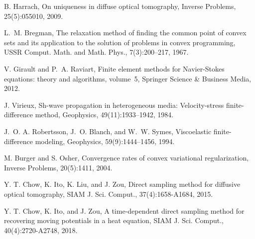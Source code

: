 \documentclass[11pt]{article}%
\renewcommand{\_}{{\fontfamily{ptm}\selectfont\textunderscore}}
\theoremstyle{plain}
\numberwithin{equation}{section}
\begin{document}
\begin{thebibliography}{lsq}
B. Harrach, On uniqueness in diffuse optical tomography, Inverse Problems, 25(5):055010, 2009.



L.~M. Bregman, The relaxation method of finding the common point of convex sets and its application to the solution of problems in convex programming, USSR Comput. Math. and Math. Phys.,
  7(3):200--217, 1967.

V. Girault and P.~A. Raviart, Finite element methods for Navier-Stokes equations: theory and
  algorithms, volume~5, Springer Science \& Business Media, 2012.
%



J. Virieux, Sh-wave propagation in heterogeneous media: Velocity-stress
  finite-difference method, Geophysics, 49(11):1933--1942, 1984.

J.~O. A. Robertsson, J.~O. Blanch, and W.~W. Symes,  Viscoelastic finite-difference modeling,  Geophysics, 59(9):1444--1456, 1994.

M. Burger and S. Osher,  Convergence rates of convex variational regularization,  Inverse Problems, 20(5):1411, 2004.


%
%



 
 
 Y. T. Chow, K. Ito, K. Liu, and J. Zou, Direct sampling method for diffusive optical tomography, SIAM J. Sci. Comput., 37(4):1658-A1684, 2015.
 
 
 
 Y. T. Chow, K. Ito, and J. Zou,  A time-dependent direct sampling method for recovering moving potentials in a heat equation, SIAM J. Sci. Comput., 40(4):2720-A2748, 2018.
 

 \end{thebibliography}












 
% 
 
\end{document}
